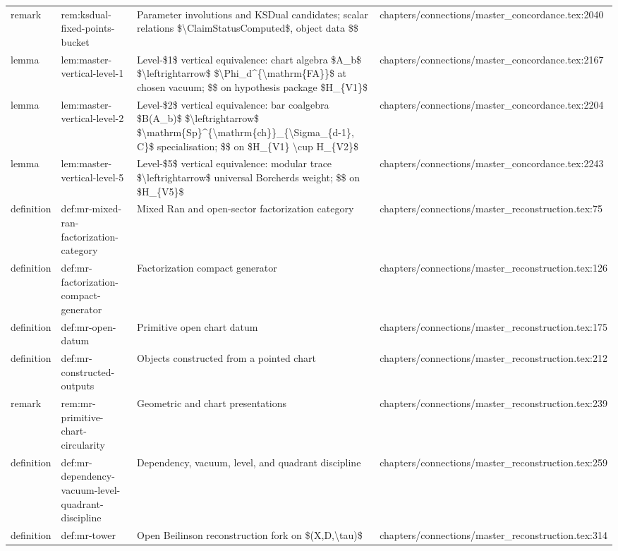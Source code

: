 \documentclass[11pt]{article}
\begin{document}
\begin{longtable}{L{0.10\textwidth}L{0.26\textwidth}L{0.42\textwidth}L{0.22\textwidth}}
remark & rem:ksdual-fixed-points-bucket & Parameter involutions and KSDual candidates; scalar relations \$\textbackslash{}ClaimStat{}usComputed\$, object data \$\$ & chapters/connections/master\_concordance.tex:2040\\
lemma & lem:master-vertical-level-1 & Level-\$1\$ vertical equivalence: chart algebra \$A\_b\$ \$\textbackslash{}leftrightarrow\$ \$\textbackslash{}Phi\_d\textasciicircum{}\{\textbackslash{}mathrm\{FA\}\}\$ at chosen vacuum; \$\$ on hypothesis package \$H\_\{V1\}\$ & chapters/connections/master\_concordance.tex:2167\\
lemma & lem:master-vertical-level-2 & Level-\$2\$ vertical equivalence: bar coalgebra \$B(A\_b)\$ \$\textbackslash{}leftrightarrow\$ \$\textbackslash{}mathrm\{Sp\}\textasciicircum{}\{\textbackslash{}mathrm\{ch\}\}\_\{\textbackslash{}Sigma\_\{d-1\}, C\}\$ specialisation; \$\$ on \$H\_\{V1\} \textbackslash{}cup H\_\{V2\}\$ & chapters/connections/master\_concordance.tex:2204\\
lemma & lem:master-vertical-level-5 & Level-\$5\$ vertical equivalence: modular trace \$\textbackslash{}leftrightarrow\$ universal Borcherds weight; \$\$ on \$H\_\{V5\}\$ & chapters/connections/master\_concordance.tex:2243\\
definition & def:mr-mixed-ran-factorization-category & Mixed Ran and op{}en-sector factorization category & chapters/connections/master\_reconstruction.tex:75\\
definition & def:mr-factorization-compact-generator & Factorization compact generator & chapters/connections/master\_reconstruction.tex:126\\
definition & def:mr-op{}en-datum & Primitive op{}en chart datum & chapters/connections/master\_reconstruction.tex:175\\
definition & def:mr-constructed-outputs & Objects constructed from a pointed chart & chapters/connections/master\_reconstruction.tex:212\\
remark & rem:mr-primitive-chart-circularity & Geometric and chart presentations & chapters/connections/master\_reconstruction.tex:239\\
definition & def:mr-dependency-vacuum-level-quadrant-discipline & Dependency, vacuum, level, and quadrant discipline & chapters/connections/master\_reconstruction.tex:259\\
definition & def:mr-tower & Op{}en Beilinson reconstruction fork on \$(X,D,\textbackslash{}tau)\$ & chapters/connections/master\_reconstruction.tex:314\\

\end{longtable}
\end{document}
